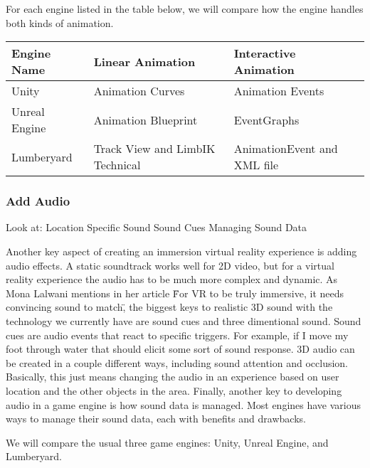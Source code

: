 \documentclass[10pt,journal,compsoc,onecolumn, draftclsnofoot]{IEEEtran}
\begin{document}
For each engine listed in the table below, we will compare how the engine handles both kinds of animation.

\vspace{2mm}
\begin{table}[h!]
\centering
  \begin{tabu} to 1.0\textwidth { | X[l] || X[c] | X[c] |  }
  \hline
  Engine Name & Linear Animation & Interactive Animation\\
  \hline
  Unity  & Animation Curves & Animation Events\\
  Unreal Engine & Animation Blueprint & EventGraphs\\
  Lumberyard & Track View and LimbIK Technical & AnimationEvent and XML file\\
  \hline
  \end{tabu}
\end{table}
\vspace{2mm}

\subsubsection{Add Audio}
Look at:
Location Specific Sound
Sound Cues
Managing Sound Data

Another key aspect of creating an immersion virtual reality experience is adding audio effects.
A static soundtrack works well for 2D video, but for a virtual reality experience the audio has to be much more complex and dynamic.
As Mona Lalwani mentions in her article \"For VR to be truly immersive, it needs convincing sound to match\", the biggest keys to realistic 3D sound with the technology we currently have are sound cues and three dimentional sound. \cite{engadget_immersive_sound}
Sound cues are audio events that react to specific triggers.  For example, if I move my foot through water that should elicit some sort of sound response.
3D audio can be created in a couple different ways, including sound attention and occlusion.
Basically, this just means changing the audio in an experience based on user location and the other objects in the area.
Finally, another key to developing audio in a game engine is how sound data is managed.  Most engines have various ways to manage their sound data, each with benefits and drawbacks.

We will compare the usual three game engines: Unity, Unreal Engine, and Lumberyard.
\end{document}
